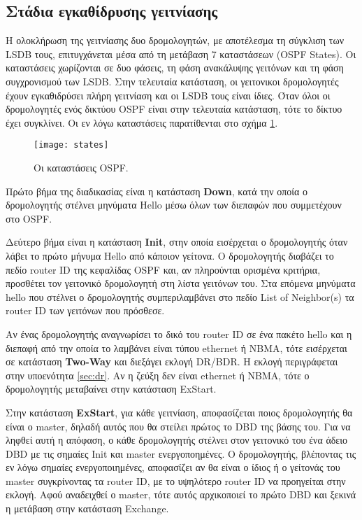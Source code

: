 \documentclass{EdipyLabs} %
\begin{document}
\subsection{Στάδια εγκαθίδρυσης γειτνίασης}

H ολοκλήρωση της γειτνίασης δυο δρομολογητών, με αποτέλεσμα τη σύγκλιση των LSDB τους, επιτυγχάνεται μέσα από τη μετάβαση 7 καταστάσεων (OSPF States). Οι καταστάσεις χωρίζονται σε δυο φάσεις, τη φάση ανακάλυψης γειτόνων και τη φάση συγχρονισμού των LSDB. Στην τελευταία κατάσταση, οι γειτονικοι δρομολογητές έχουν εγκαθιδρύσει πλήρη γειτνίαση και οι LSDB τους είναι ίδιες. Όταν όλοι οι δρομολογητές ενός δικτύου OSPF είναι στην τελευταία κατάσταση, τότε το δίκτυο έχει συγκλίνει. Οι εν λόγω καταστάσεις παρατίθενται στο σχήμα \ref{fig:states}.

\begin{figure}[ht]
	\centering
	\texttt{[image: states]}
	\caption{Οι καταστάσεις OSPF.}\label{fig:states}
\end{figure}

Πρώτο βήμα της διαδικασίας είναι η κατάσταση \textbf{Down}, κατά την οποία ο δρομολογητής στέλνει μηνύματα Hello μέσω όλων των διεπαφών που συμμετέχουν στο OSPF. 

Δεύτερο βήμα είναι η κατάσταση \textbf{Init}, στην οποία εισέρχεται ο δρομολογητής όταν λάβει το πρώτο μήνυμα Hello από κάποιον γείτονα. Ο δρομολογητής διαβάζει το πεδίο router ID της κεφαλίδας OSPF και, αν πληρούνται ορισμένα κριτήρια, προσθέτει τον γειτονικό δρομολογητή στη λίστα γειτόνων του. Στα επόμενα μηνύματα hello που στέλνει ο δρομολογητής συμπεριλαμβάνει στο πεδίο List of Neighbor(s) τα router ID των γειτόνων που πρόσθεσε.


Αν ένας δρομολογητής αναγνωρίσει το δικό του router ID σε ένα πακέτο hello και η διεπαφή από την οποία το λαμβάνει είναι τύπου ethernet ή NBMA, τότε εισέρχεται σε κατάσταση \textbf{Two-Way} και διεξάγει εκλογή DR/BDR. H εκλογή περιγράφεται στην υποενότητα \ref{sec:dr}. Αν η ζεύξη δεν είναι ethernet ή NBMA, τότε ο δρομολογητής μεταβαίνει στην κατάσταση ExStart.

Στην κατάσταση \textbf{ExStart}, για κάθε γειτνίαση, αποφασίζεται ποιος δρομολογητής θα είναι ο master, δηλαδή αυτός που θα στείλει πρώτος το DBD της βάσης του. Για να ληφθεί αυτή η απόφαση, ο κάθε δρομολογητής στέλνει στον γειτονικό του ένα άδειο DBD με τις σημαίες Init και master ενεργοποημένες. Ο δρομολογητής, βλέποντας τις εν λόγω σημαίες ενεργοποιημένες, αποφασίζει αν θα είναι ο ίδιος ή ο γείτονάς του master συγκρίνοντας τα router ID, με το υψηλότερο router ID να προηγείται στην εκλογή. Αφού αναδειχθεί ο master, τότε αυτός αρχικοποιεί το πρώτο DBD και ξεκινά η μετάβαση στην κατάσταση Exchange.
\end{document}
